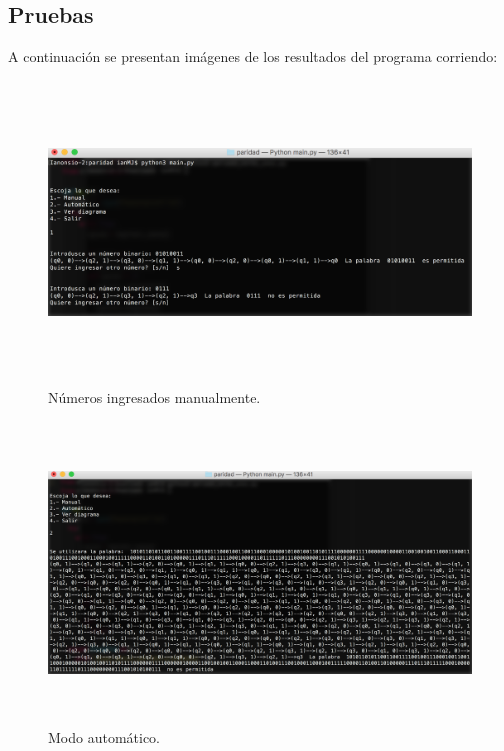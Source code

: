 \documentclass[12pt]{article}
\begin{document}
\newpage
\subsection{Pruebas}
A continuación se presentan imágenes de los resultados del programa corriendo:

\begin{figure}[H]
\includegraphics[width=\textwidth, height=8cm]{paridad_manual}
\caption{Números ingresados manualmente.}
\label{fig:automata_paridad_texto}
\end{figure}

\begin{figure}[H]
\includegraphics[width=\textwidth, height=8cm]{paridad_auto}
\caption{Modo automático.}
\label{fig:automata_paridad_auto}
\end{figure}
\end{document}
